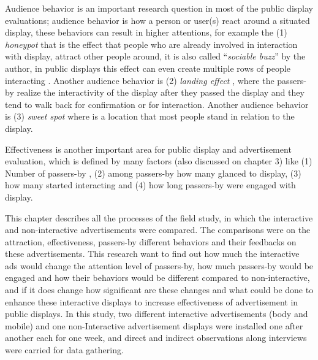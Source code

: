 Audience behavior is an important research question in most of the public display evaluations; audience behavior is how a person or user(s) react around a situated display, these behaviors can result in higher attentions, for example the (1) \emph{honeypot} \cite{EnticingPeople} that is the effect that people who are already involved in interaction with display, attract other people around, it is also called ``\emph{sociable buzz}'' by the author, in public displays this effect can even create multiple rows of people interacting \cite{LookingGlass}. Another audience behavior is (2) \emph{landing effect} \cite{LookingGlass}, where the passers-by realize the interactivity of the display after they passed the display and they tend to walk back for confirmation or for interaction. Another audience behavior is (3) \emph {sweet spot} \cite{CylindricalScreen} where is a location that most people stand in relation to the display. 


Effectiveness is another important area for public display and advertisement evaluation, which is defined by many factors (also discussed on chapter 3) like (1) Number of passers-by \cite{glancingcount, digitalSignage}, (2) among passers-by how many glanced \cite{glancingcount, When_display, display_blindness} to display, (3) how many started interacting \cite{LookingGlass, glancingcount} and (4) how long passers-by were engaged with display.

This chapter describes all the processes of the field study, in which the interactive and non-interactive advertisements were compared. The comparisons were on the attraction, effectiveness, passers-by different behaviors and their feedbacks on these advertisements. This research want to find out how much the interactive ads would change the attention level of passers-by, how much passers-by would be engaged and how their behaviors would be different compared to non-interactive, and if it does change how significant are these changes and what could be done to enhance these interactive displays to increase effectiveness of advertisement in public displays.  In this study, two different interactive advertisements (body and mobile) and one non-Interactive advertisement displays were installed one after another each for one week, and direct and indirect observations along interviews were carried for data gathering. 



